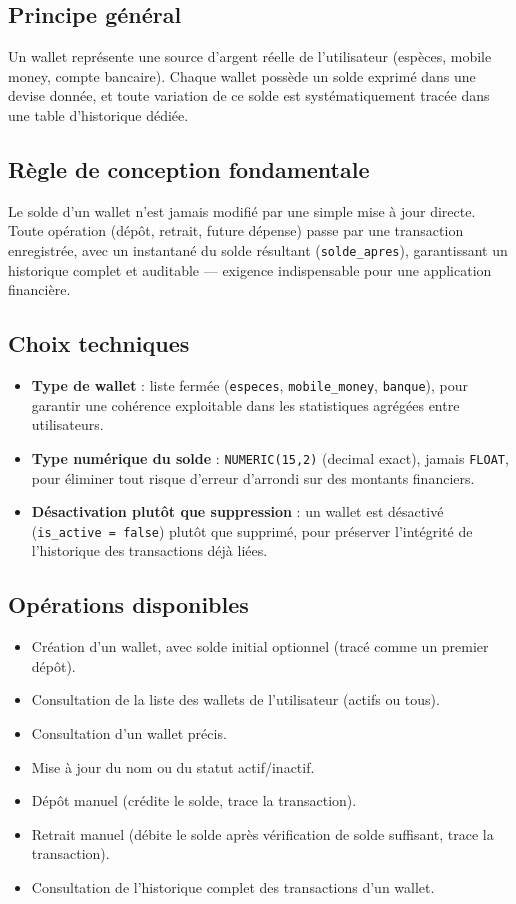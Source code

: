 \documentclass[11pt,a4paper]{article}
\begin{document}
\subsection{Principe général}
Un wallet représente une source d'argent réelle de l'utilisateur (espèces, mobile money, compte bancaire). Chaque wallet possède un solde exprimé dans une devise donnée, et toute variation de ce solde est systématiquement tracée dans une table d'historique dédiée.

\subsection{Règle de conception fondamentale}
Le solde d'un wallet n'est jamais modifié par une simple mise à jour directe. Toute opération (dépôt, retrait, future dépense) passe par une transaction enregistrée, avec un instantané du solde résultant (\texttt{solde\_apres}), garantissant un historique complet et auditable — exigence indispensable pour une application financière.

\subsection{Choix techniques}
\begin{itemize}[leftmargin=*]
    \item \textbf{Type de wallet} : liste fermée (\texttt{especes}, \texttt{mobile\_money}, \texttt{banque}), pour garantir une cohérence exploitable dans les statistiques agrégées entre utilisateurs.
    \item \textbf{Type numérique du solde} : \texttt{NUMERIC(15,2)} (decimal exact), jamais \texttt{FLOAT}, pour éliminer tout risque d'erreur d'arrondi sur des montants financiers.
    \item \textbf{Désactivation plutôt que suppression} : un wallet est désactivé (\texttt{is\_active = false}) plutôt que supprimé, pour préserver l'intégrité de l'historique des transactions déjà liées.
\end{itemize}

\subsection{Opérations disponibles}
\begin{itemize}[leftmargin=*]
    \item Création d'un wallet, avec solde initial optionnel (tracé comme un premier dépôt).
    \item Consultation de la liste des wallets de l'utilisateur (actifs ou tous).
    \item Consultation d'un wallet précis.
    \item Mise à jour du nom ou du statut actif/inactif.
    \item Dépôt manuel (crédite le solde, trace la transaction).
    \item Retrait manuel (débite le solde après vérification de solde suffisant, trace la transaction).
    \item Consultation de l'historique complet des transactions d'un wallet.
\end{itemize}
\end{document}
